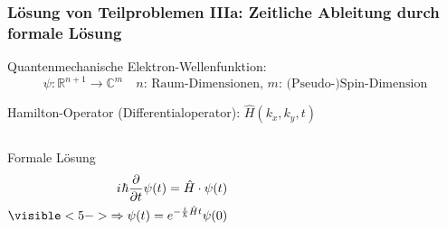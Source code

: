 \documentclass{beamer}
\newcommand{\iu}{{i\mkern1mu}} 	%
\begin{document}
\begin{frame}[t] %
  \frametitle{Lösung von Teilproblemen IIIa: Zeitliche Ableitung durch formale Lösung}
 Quantenmechanische Elektron-Wellenfunktion: \begin{equation*}\psi: \mathbb{R}^{n+1} \rightarrow \mathbb{C}^m \quad \text{$n$: Raum-Dimensionen, $m$: (Pseudo-)Spin-Dimension}\end{equation*}

 Hamilton-Operator (Differentialoperator): $\hat{H}(k_x, k_y, t)$

 \begin{columns}
 \begin{block}{Formale Lösung}
  \begin{align*}
    \iu \hbar \frac{\partial}{\partial t}  \psi(t) = \hat{H} \cdot \psi(t)  \\
    \visible<5->{\Rightarrow  \psi(t) = e^{-\frac{\iu}{\hbar}\hat{H}t} \psi(0)}
  \end{align*}
    \end{block}
    
     
  \end{columns}
\end{frame}
\end{document}
